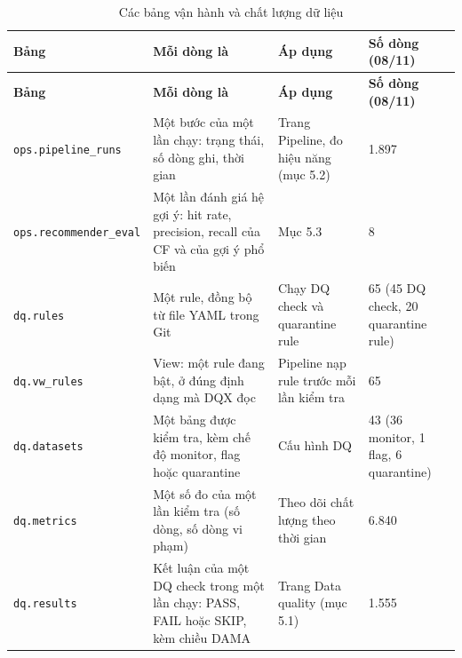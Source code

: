 \documentclass[a4paper,11pt]{article}
\newlength{\reporttablewidth}
\newcommand{\dbsep}{\_\allowbreak}
\begin{document}
\begingroup
\small
{}
\setlength{\tabcolsep}{4pt}
\renewcommand{\arraystretch}{1.18}
\setlength{\reporttablewidth}{\dimexpr\linewidth-6\tabcolsep\relax}
\begin{longtable}{@{}L{0.24\reporttablewidth} L{0.34\reporttablewidth} L{0.26\reporttablewidth} L{0.16\reporttablewidth}@{}}
\caption[Các bảng vận hành và chất lượng dữ liệu (Phụ lục E)]{Các bảng vận hành và chất lượng dữ liệu}\label{tab:30} \\
\toprule
\textbf{Bảng} & \textbf{Mỗi dòng là} & \textbf{Áp dụng} & \textbf{Số dòng (08/11)} \\
\midrule
\endfirsthead
\toprule
\textbf{Bảng} & \textbf{Mỗi dòng là} & \textbf{Áp dụng} & \textbf{Số dòng (08/11)} \\
\midrule
\endhead
\midrule
\endfoot
\bottomrule
\endlastfoot
\texttt{ops.\allowbreak{}pipeline\dbsep{}runs} & Một bước của một lần chạy: trạng thái, số dòng ghi, thời gian & Trang Pipeline, đo hiệu năng (mục 5.2) & 1.897 \\
\texttt{ops.\allowbreak{}recommender\dbsep{}eval} & Một lần đánh giá hệ gợi ý: hit rate, precision, recall của CF và của gợi ý phổ biến & Mục 5.3 & 8 \\
\texttt{dq.\allowbreak{}rules} & Một rule, đồng bộ từ file YAML trong Git & Chạy DQ check và quarantine rule & 65 (45 DQ check, 20 quarantine rule) \\
\texttt{dq.\allowbreak{}vw\dbsep{}rules} & View: một rule đang bật, ở đúng định dạng mà DQX đọc & Pipeline nạp rule trước mỗi lần kiểm tra & 65 \\
\texttt{dq.\allowbreak{}datasets} & Một bảng được kiểm tra, kèm chế độ monitor, flag hoặc quarantine & Cấu hình DQ & 43 (36 monitor, 1 flag, 6 quarantine) \\
\texttt{dq.\allowbreak{}metrics} & Một số đo của một lần kiểm tra (số dòng, số dòng vi phạm) & Theo dõi chất lượng theo thời gian & 6.840 \\
\texttt{dq.\allowbreak{}results} & Kết luận của một DQ check trong một lần chạy: PASS, FAIL hoặc SKIP, kèm chiều DAMA & Trang Data quality (mục 5.1) & 1.555 \\
\end{longtable}
\endgroup
\end{document}
